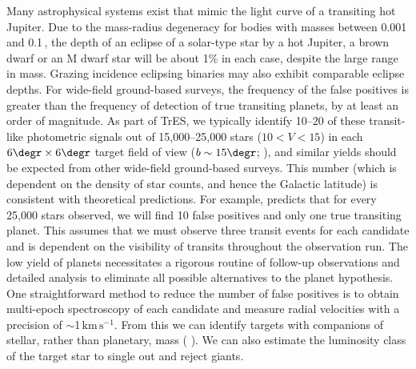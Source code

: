 Many astrophysical systems exist that mimic the light curve of a
transiting hot Jupiter. Due to the mass-radius degeneracy for bodies
with masses between 0.001 and 0.1\,\msun, the depth of an eclipse
of a solar-type star by a hot Jupiter, a brown dwarf or an M dwarf
star will be about 1\% in each case, despite the large range in mass.
Grazing incidence eclipsing binaries may also exhibit comparable
eclipse depths. For wide-field ground-based surveys, the frequency
of the false positives is greater than the frequency of detection of
true transiting planets, by at least an order of magnitude.  As part
of TrES, we typically identify 10--20 of these transit-like
photometric signals out of 15,000--25,000 stars ($10<V<15$) in each
$6\degr \times 6\degr$ target field of view ($b\sim15\degr$; %
\citealp[see, e.g.,][]{Dunham_Mandushev_Taylor:pasp:2004a}), and%
similar yields should be expected from other wide-field ground-based
surveys. This number (which is dependent on the density of star
counts, and hence the Galactic latitude) is consistent with
theoretical predictions. For example, \citet{Brown:apjl:2003a} predicts
that for every 25,000 stars observed, we will find 10 false positives
and only one true transiting planet. This assumes that we must observe three transit events for each candidate and is dependent on the
visibility of transits throughout the observation run. The low yield
of planets necessitates a rigorous routine of follow-up observations
and detailed analysis to eliminate all possible alternatives to the
planet hypothesis. One straightforward method to reduce the number of
false positives is to obtain multi-epoch spectroscopy of each
candidate and measure radial velocities with a precision of $\sim$1\,$\mathrm{km\,s^{-1}}$. From this we can identify targets with
companions of stellar, rather than planetary, mass (%
\citealp[see,
e.g.,][]{Latham:ASP:2003a, Charbonneau_Brown_Dunham:AIP:2004a}). We can
also estimate the luminosity class of the target star to single out
and reject giants.

